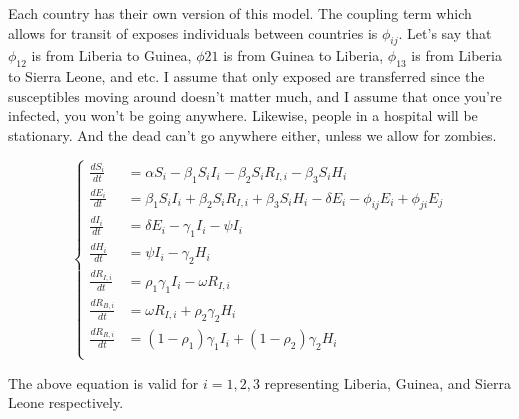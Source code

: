 \documentclass{article}
\begin{document}
Each country has their own version of this model. The coupling term which allows
for transit of exposes individuals between countries is $\phi_{ij}$. Let's say
that $\phi_{12}$ is from Liberia to Guinea, $\phi{21}$ is from Guinea to
Liberia, $\phi_{13}$ is from Liberia to Sierra Leone, and etc. I assume that
only exposed are transferred since the susceptibles moving around doesn't matter
much, and I assume that once you're infected, you won't be going anywhere.
Likewise, people in a hospital will be stationary. And the dead can't go
anywhere either, unless we allow for zombies.



\begin{equation} \left\lbrace
\begin{aligned} 
    \frac{dS_i}{dt} &= \alpha S_i - \beta_1 S_i I_i -\beta_2 S_i R_{I,i} -\beta_3S_iH_i\\
    \frac{dE_i}{dt} &=  \beta_1 S_i I_i +\beta_2 S_i R_{I,i} +\beta_3S_iH_i-
    \delta E_i - \phi_{ij}E_i + \phi_{ji} E_j\\
\frac{dI_i}{dt} &=  \delta E_i - \gamma_1 I_i-\psi I_i\\
\frac{dH_i}{dt} &= \psi I_i - \gamma_2 H_i \\ %
    \frac{dR_{I,i}}{dt} &= \rho_1\gamma_1 I_i - \omega R_{I,i} \\
    \frac{dR_{B,i}}{dt} &= \omega R_{I,i}+\rho_2\gamma_2 H_i \\ %
    \frac{dR_{R,i}}{dt} &= (1-\rho_1)\gamma_1 I_i+(1-\rho_2)\gamma_2 H_i \\%
\end{aligned} \label{std_seir}
\right.
 \end{equation} 

The above equation is valid for $i=1,2,3$ representing Liberia, Guinea, and
Sierra Leone respectively.
                                            
\end{document}
